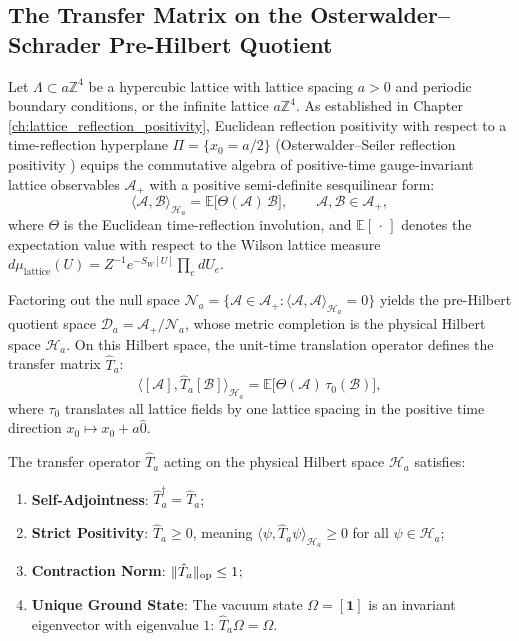 \subsection{The Transfer Matrix on the Osterwalder--Schrader Pre-Hilbert Quotient}
\label{subsec:os_prehilbert_transfer}

Let $\Lambda \subset a \mathbb{Z}^4$ be a hypercubic lattice with lattice spacing $a > 0$ and periodic boundary conditions, or the infinite lattice $a \mathbb{Z}^4$. As established in Chapter \ref{ch:lattice_reflection_positivity}, Euclidean reflection positivity with respect to a time-reflection hyperplane $\Pi = \{x_0 = a/2\}$ (Osterwalder--Seiler reflection positivity \cite{OsterwalderSeiler1978}) equips the commutative algebra of positive-time gauge-invariant lattice observables $\mathcal{A}_+$ with a positive semi-definite sesquilinear form:
\begin{equation}
\label{eq:inner_product_os_quotient}
\langle \mathcal{A}, \mathcal{B} \rangle_{\mathcal{H}_a} = \mathbb{E}\bigl[ \Theta(\mathcal{A}) \, \mathcal{B} \bigr], \qquad \mathcal{A}, \mathcal{B} \in \mathcal{A}_+,
\end{equation}
where $\Theta$ is the Euclidean time-reflection involution, and $\mathbb{E}[\,\cdot\,]$ denotes the expectation value with respect to the Wilson lattice measure $d\mu_{\mathrm{lattice}}(U) = Z^{-1} e^{-S_W[U]} \prod_{e} dU_e$.

Factoring out the null space $\mathcal{N}_a = \{ \mathcal{A} \in \mathcal{A}_+ : \langle \mathcal{A}, \mathcal{A} \rangle_{\mathcal{H}_a} = 0 \}$ yields the pre-Hilbert quotient space $\mathcal{D}_a = \mathcal{A}_+ / \mathcal{N}_a$, whose metric completion is the physical Hilbert space $\mathcal{H}_a$. On this Hilbert space, the unit-time translation operator defines the transfer matrix $\hat{T}_a$:
\begin{equation}
\langle [\mathcal{A}], \hat{T}_a [\mathcal{B}] \rangle_{\mathcal{H}_a} = \mathbb{E}\bigl[ \Theta(\mathcal{A}) \, \tau_0(\mathcal{B}) \bigr],
\end{equation}
where $\tau_0$ translates all lattice fields by one lattice spacing in the positive time direction $x_0 \mapsto x_0 + a\hat{0}$.

\begin{proposition}
\label{prop:transfer_bounds_fundamental}
The transfer operator $\hat{T}_a$ acting on the physical Hilbert space $\mathcal{H}_a$ satisfies:
\begin{enumerate}
    \item \textbf{Self-Adjointness}: $\hat{T}_a^\dagger = \hat{T}_a$;
    \item \textbf{Strict Positivity}: $\hat{T}_a \ge 0$, meaning $\langle \psi, \hat{T}_a \psi \rangle_{\mathcal{H}_a} \ge 0$ for all $\psi \in \mathcal{H}_a$;
    \item \textbf{Contraction Norm}: $\|\hat{T}_a\|_{\mathrm{op}} \le 1$;
    \item \textbf{Unique Ground State}: The vacuum state $\Omega = [\mathbf{1}]$ is an invariant eigenvector with eigenvalue $1$: $\hat{T}_a \Omega = \Omega$.
\end{enumerate}
\end{proposition}


